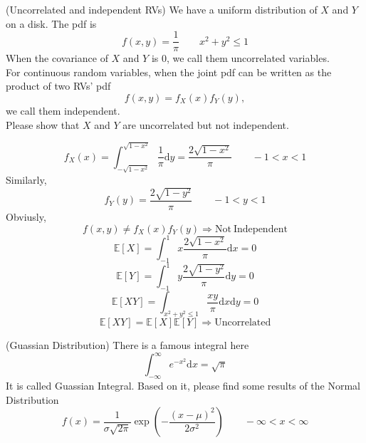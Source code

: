 \documentclass[a4paper, 12pt, answers]{exam} %
\begin{document}
\begin{questions}
	
	\question (Uncorrelated and independent RVs) We have a uniform distribution of $X$ and $Y$ on a disk. The pdf is 
	\begin{equation*}
	f(x,y)=\frac1\pi \qquad x^2+y^2 \le 1
	\end{equation*}
	When the covariance of $X$ and $Y$ is $0$, we call them uncorrelated variables.\\
	For continuous random variables, when the joint pdf can be written as the product of two RVs' pdf
	\begin{equation*}
	f\left(x,y\right)=f_X\left(x\right)f_Y\left(y\right),
	\end{equation*} 
	we call them independent.\\
	Please show that $X$ and $Y$ are uncorrelated but not independent.
	
	\begin{solution}
		\begin{equation*}
		f_{X}(x)=\int_{-\sqrt{1-x^2}}^{\sqrt{1-x^2}}\frac 1\pi \mathrm{d}y=\frac{2\sqrt{1-x^2}}{\pi} \qquad -1<x<1
		\end{equation*}
		Similarly,
		\begin{equation*}
		f_{Y}(y)=\frac{2\sqrt{1-y^2}}{\pi}\qquad -1<y<1
		\end{equation*}
		Obviusly,
		\begin{equation*}
		f(x,y) \neq f_X(x)f_Y(y) \Rightarrow \mathrm{Not \ Independent}
	    \end{equation*} 
	    \begin{equation*}
	    \mathbb{E}\left[X\right]=\int_{-1}^1 x\frac{2\sqrt{1-x^2}}{\pi} \mathrm{d}x=0
	    \end{equation*}
	    \begin{equation*}
	    \mathbb{E}\left[Y\right]=\int_{-1}^1 y\frac{2\sqrt{1-y^2}}{\pi} \mathrm{d}y=0
	    \end{equation*}
	    \begin{equation*}
	    \mathbb{E}\left[XY\right]=\int_{x^2+y^2 \le 1} \frac{xy}{\pi} \mathrm{d}x\mathrm{d}y=0
	    \end{equation*}
	    \begin{equation*}
	    \mathbb{E}\left[XY\right]=\mathbb{E}\left[X\right]\mathbb{E}\left[Y\right]\Rightarrow \mathrm{Uncorrelated}
	    \end{equation*}
	    
	    
	\end{solution}

	\question(Guassian Distribution)
	There is a famous integral here
	\begin{equation*}
	\int_{-\infty}^{\infty}e^{-x^2}\mathrm{d}x=\sqrt{\pi}
	\end{equation*}
	It is called Guassian Integral.
	Based on it, please find some results of the Normal Distribution
	\begin{equation*}
	f(x)=\frac 1{\sigma \sqrt{2\pi}}\exp\left({-\frac{(x-\mu)^2}{2\sigma^2}}\right) \qquad -\infty < x <\infty
	\end{equation*}  
	

\end{questions}
\end{document}
